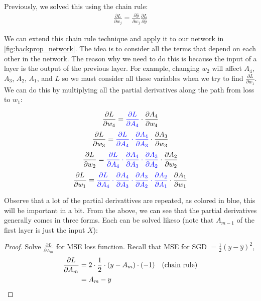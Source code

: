 \documentclass[11pt]{article}
\numberwithin{equation}{section}
\theoremstyle{definition}%
\begin{document}
Previously, we solved this using the chain rule:
\begin{align}
    \frac{\partial L}{\partial w_j} = \frac{\partial \hat{y}}{\partial w_j} \frac{\partial L}{\partial \hat{y}}
\end{align}

We can extend this chain rule technique and apply it to our network in \autoref{fig:backprop_network}. The idea is to consider all the terms that depend on each other in the network. The reason why we need to do this is because the input of a layer is the output of the previous layer. For example, changing $w_2$ will affect $A_4$, $A_3$, $A_2$, $A_1$, and $L$ so we must consider all these variables when we try to find $\frac{\partial L}{\partial w_1}$. We can do this by multiplying all the partial derivatives along the path from loss to $w_1$:

\begin{align}
    \frac{\partial L}{\partial w_4} = \color{blue} \frac{\partial L}{\partial A_4} \color{black} \cdot \frac{\partial A_4}{\partial w_4}
\end{align}
\begin{align}
    \frac{\partial L}{\partial w_3} = \color{blue} \frac{\partial L}{\partial A_4} \cdot \frac{\partial A_4}{\partial A_3} \color{black} \cdot \frac{\partial A_3}{\partial w_3}
\end{align}
\begin{align}
    \frac{\partial L}{\partial w_2} = \color{blue} \frac{\partial L}{\partial A_4} \cdot \frac{\partial A_4}{\partial A_3} \cdot \frac{\partial A_3}{\partial A_2} \color{black} \cdot \frac{\partial A_2}{\partial w_2}
\end{align}
\begin{align}
    \frac{\partial L}{\partial w_1} = \color{blue} \frac{\partial L}{\partial A_4} \cdot \frac{\partial A_4}{\partial A_3} \cdot \frac{\partial A_3}{\partial A_2} \cdot \frac{\partial A_2}{\partial A_1} \color{black} \cdot \frac{\partial A_1}{\partial w_1}
\end{align}

Observe that a lot of the partial derivattives are repeated, as colored in blue, this will be important in a bit. From the above, we can see that the partial derivatives generally comes in three forms. Each can be solved likeso (note that $A_{m-1}$ of the first layer is just the input $X$):

\begin{proof}
    Solve $\frac{\partial L}{\partial A_m}$ for MSE loss function. Recall that MSE for SGD $= \frac{1}{2}(y - \hat{y})^2$,
    \begin{align*}
      \frac{\partial L}{\partial A_m} &= 2 \cdot \frac{1}{2} \cdot (y - A_m) \cdot (-1)  &&\text{(chain rule)} \\
      &= A_m - y &&\qedhere\\
    \end{align*}
\end{proof}
\end{document}
